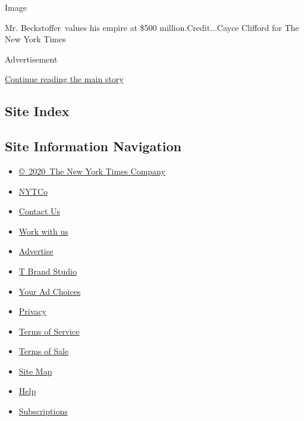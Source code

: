 Image

Mr. Beckstoffer~values his empire at \$500 million.Credit...Cayce
Clifford for The New York Times

Advertisement

\protect\hyperlink{after-bottom}{Continue reading the main story}

\hypertarget{site-index}{%
\subsection{Site Index}\label{site-index}}

\hypertarget{site-information-navigation}{%
\subsection{Site Information
Navigation}\label{site-information-navigation}}

\begin{itemize}
\tightlist
\item
  \href{https://help.nytimes3xbfgragh.onion/hc/en-us/articles/115014792127-Copyright-notice}{©~2020~The
  New York Times Company}
\end{itemize}

\begin{itemize}
\tightlist
\item
  \href{https://www.nytco.com/}{NYTCo}
\item
  \href{https://help.nytimes3xbfgragh.onion/hc/en-us/articles/115015385887-Contact-Us}{Contact
  Us}
\item
  \href{https://www.nytco.com/careers/}{Work with us}
\item
  \href{https://nytmediakit.com/}{Advertise}
\item
  \href{http://www.tbrandstudio.com/}{T Brand Studio}
\item
  \href{https://www.nytimes3xbfgragh.onion/privacy/cookie-policy\#how-do-i-manage-trackers}{Your
  Ad Choices}
\item
  \href{https://www.nytimes3xbfgragh.onion/privacy}{Privacy}
\item
  \href{https://help.nytimes3xbfgragh.onion/hc/en-us/articles/115014893428-Terms-of-service}{Terms
  of Service}
\item
  \href{https://help.nytimes3xbfgragh.onion/hc/en-us/articles/115014893968-Terms-of-sale}{Terms
  of Sale}
\item
  \href{https://spiderbites.nytimes3xbfgragh.onion}{Site Map}
\item
  \href{https://help.nytimes3xbfgragh.onion/hc/en-us}{Help}
\item
  \href{https://www.nytimes3xbfgragh.onion/subscription?campaignId=37WXW}{Subscriptions}
\end{itemize}
